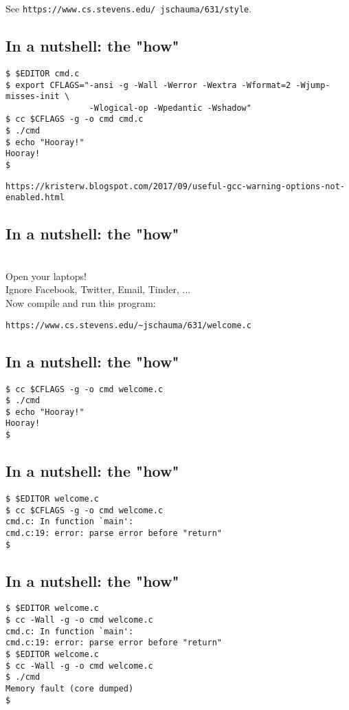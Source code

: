 \documentclass[sxga]{xdvislides}
\begin{document}
See {\tt https://www.cs.stevens.edu/~jschauma/631/style}.

\subsection{In a nutshell: the "how"}
\begin{verbatim}
$ $EDITOR cmd.c
$ export CFLAGS="-ansi -g -Wall -Werror -Wextra -Wformat=2 -Wjump-misses-init \
                 -Wlogical-op -Wpedantic -Wshadow"
$ cc $CFLAGS -g -o cmd cmd.c
$ ./cmd
$ echo "Hooray!"
Hooray!
$
\end{verbatim}
\addvspace{.5in}

{\tt https://kristerw.blogspot.com/2017/09/useful-gcc-warning-options-not-enabled.html}

\subsection{In a nutshell: the "how"}
\\

\Hugesize
Open your laptops! \\
\small
Ignore Facebook, Twitter, Email, Tinder, ... \\

\Hugesize
Now compile and run this program: \\
\begin{verbatim}
https://www.cs.stevens.edu/~jschauma/631/welcome.c
\end{verbatim}
\Normalsize

\subsection{In a nutshell: the "how"}
\begin{verbatim}
$ cc $CFLAGS -g -o cmd welcome.c
$ ./cmd
$ echo "Hooray!"
Hooray!
$
\end{verbatim}

\subsection{In a nutshell: the "how"}
\begin{verbatim}
$ $EDITOR welcome.c
$ cc $CFLAGS -g -o cmd welcome.c
cmd.c: In function `main':
cmd.c:19: error: parse error before "return"
$
\end{verbatim}

\subsection{In a nutshell: the "how"}
\begin{verbatim}
$ $EDITOR welcome.c
$ cc -Wall -g -o cmd welcome.c
cmd.c: In function `main':
cmd.c:19: error: parse error before "return"
$ $EDITOR welcome.c
$ cc -Wall -g -o cmd welcome.c
$ ./cmd
Memory fault (core dumped)
$
\end{verbatim}
\end{document}
